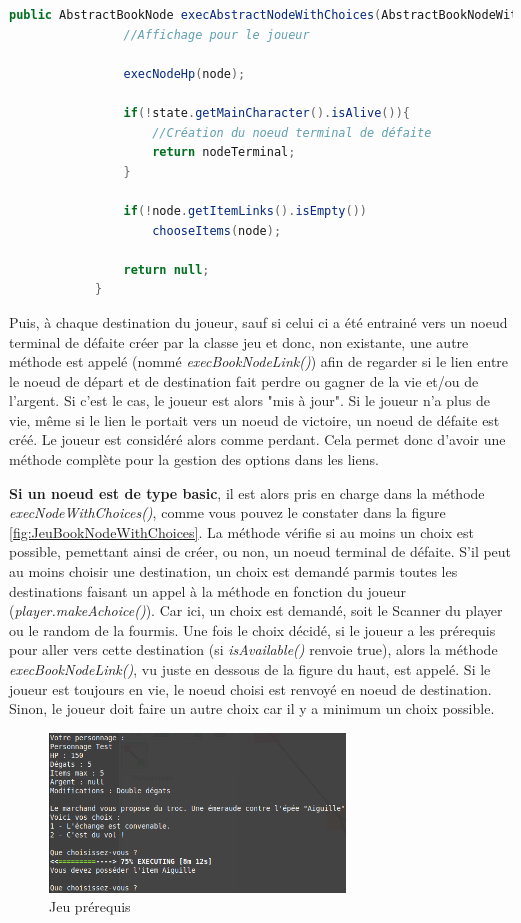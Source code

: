 		\begin{lstlisting}[gobble=12, language=java, caption=Méthode execAbstractNodeWithChoices(), label=lst:execAbstractNodeWithChoices]
			public AbstractBookNode execAbstractNodeWithChoices(AbstractBookNodeWithChoices node){
				//Affichage pour le joueur

				execNodeHp(node);

				if(!state.getMainCharacter().isAlive()){
					//Création du noeud terminal de défaite
					return nodeTerminal;
				}

				if(!node.getItemLinks().isEmpty())
					chooseItems(node);

				return null;
			}
		\end{lstlisting}

		Puis, à chaque destination du joueur, sauf si celui ci a été entrainé vers un noeud terminal de défaite créer par la classe jeu et donc, non existante, une autre méthode est appelé (nommé \textit{execBookNodeLink()}) afin de regarder si le lien entre le noeud de départ et de destination fait perdre ou gagner de la vie et/ou de l'argent. Si c'est le cas, le joueur est alors "mis à jour". Si le joueur n'a plus de vie, même si le lien le portait vers un noeud de victoire, un noeud de défaite est créé. Le joueur est considéré alors comme perdant. Cela permet donc d'avoir une méthode complète pour la gestion des options dans les liens.

		\textbf{Si un noeud est de type basic}, il est alors pris en charge dans la méthode \textit{execNodeWithChoices()}, comme vous pouvez le constater dans la figure \ref{fig:JeuBookNodeWithChoices}. La méthode vérifie si au moins un choix est possible, pemettant ainsi de créer, ou non, un noeud terminal de défaite. S'il peut au moins choisir une destination, un choix est demandé parmis toutes les destinations faisant un appel à la méthode en fonction du joueur (\textit{player.makeAchoice()}). Car ici, un choix est demandé, soit le Scanner du player ou le random de la fourmis. Une fois le choix décidé, si le joueur a les prérequis pour aller vers cette destination (si \textit{isAvailable()} renvoie true), alors la méthode \textit{execBookNodeLink()}, vu juste en dessous de la figure du haut, est appelé. Si le joueur est toujours en vie, le noeud choisi est renvoyé en noeud de destination. Sinon, le joueur doit faire un autre choix car il y a minimum un choix possible.\\

		\begin{figure}[H]
			\centering\includegraphics[width=0.70\textwidth]{img/codeJeuPrerequis.png}
			\caption{Jeu prérequis}
			\label{fig:codeJeuPrerequis}
		\end{figure}

